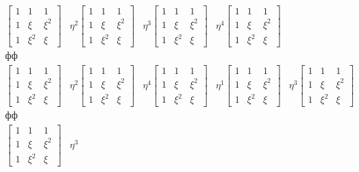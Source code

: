 \documentclass{mai_book}
\begin{document}
{$$\begin{array}{ccccc}
\begin{bmatrix}1 & 1 & 1 \\1 & \xi & \xi^2 \\ 1 & \xi^2 & \xi \end{bmatrix} & \eta^2
\begin{bmatrix}1 & 1 & 1 \\1 & \xi & \xi^2 \\ 1 & \xi^2 & \xi \end{bmatrix} & \eta^3
\begin{bmatrix}1 & 1 & 1 \\1 & \xi & \xi^2 \\ 1 & \xi^2 & \xi \end{bmatrix} & \eta^4
\begin{bmatrix}1 & 1 & 1 \\1 & \xi & \xi^2 \\ 1 & \xi^2 & \xi\end{bmatrix}  \\
фф\\
\begin{bmatrix}1 & 1 & 1 \\1 & \xi & \xi^2 \\ 1 & \xi^2 & \xi \end{bmatrix} & \eta^2
\begin{bmatrix}1 & 1 & 1 \\1 & \xi & \xi^2 \\ 1 & \xi^2 & \xi \end{bmatrix} & \eta^4
\begin{bmatrix}1 & 1 & 1 \\1 & \xi & \xi^2 \\ 1 & \xi^2 & \xi \end{bmatrix} & \eta^1
\begin{bmatrix}1 & 1 & 1 \\1 & \xi & \xi^2 \\ 1 & \xi^2 & \xi \end{bmatrix} & \eta^3
\begin{bmatrix}1 & 1 & 1 \\1 & \xi & \xi^2 \\ 1 & \xi^2 & \xi\end{bmatrix}  \\
фф\\
\begin{bmatrix}1 & 1 & 1 \\1 & \xi & \xi^2 \\ 1 & \xi^2 & \xi \end{bmatrix} & \eta^3

\end{array}$$}
\end{document}
